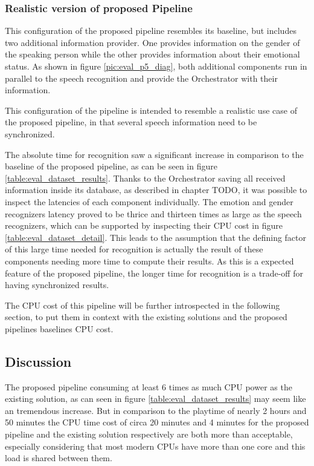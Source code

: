 \subsubsection{Realistic version of proposed Pipeline}
This configuration of the proposed pipeline resembles its baseline, but includes two additional information provider. 
One provides information on the gender of the speaking person while the other provides information about their emotional status.
As shown in figure \ref{pic:eval_p5_diag}, both additional components run in parallel to the speech recognition and provide the Orchestrator with their information.

This configuration of the pipeline is intended to resemble a realistic use case of the proposed pipeline, in that several speech information need to be synchronized.

The absolute time for recognition saw a significant increase in comparison to the baseline of the proposed pipeline, as can be seen in figure \ref{table:eval_dataset_results}.
Thanks to the Orchestrator saving all received information inside its database, as described in chapter TODO, it was possible to inspect the latencies of each component individually.
The emotion and gender recognizers latency proved to be thrice and thirteen times as large as the speech recognizers, which can be supported by inspecting their CPU cost in figure \ref{table:eval_dataset_detail}.
This leads to the assumption that the defining factor of this large time needed for recognition is actually the result of these components needing more time to compute their results.
As this is a expected feature of the proposed pipeline, the longer time for recognition is a trade-off for having synchronized results.

The CPU cost of this pipeline will be further introspected in the following section, to put them in context with the existing solutions and the proposed pipelines baselines CPU cost.


\subsection{Discussion}
\label{eval:discussion}

The proposed pipeline consuming at least 6 times as much CPU power as the existing solution, as can seen in figure \ref{table:eval_dataset_results} may seem like an tremendous increase.
But in comparison to the playtime of nearly 2 hours and 50 minutes the CPU time cost of circa 20 minutes and 4 minutes for the proposed pipeline and the existing solution respectively are both more than acceptable, especially considering that most modern CPUs have more than one core and this load is shared between them.

